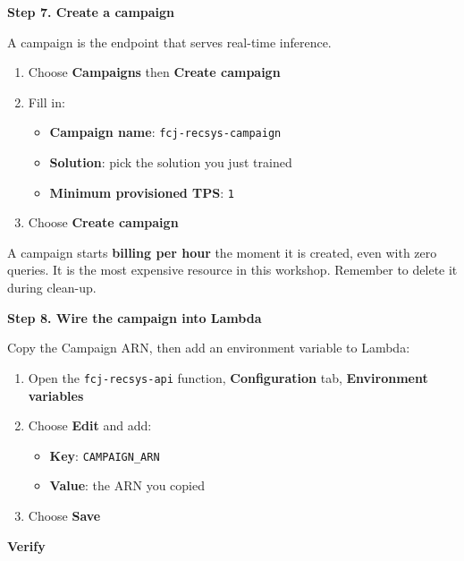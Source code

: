 \vspace{0.5em}\noindent\textbf{Step 7. Create a campaign}\par

A campaign is the endpoint that serves real-time inference.

\begin{enumerate}
\def\labelenumi{\arabic{enumi}.}
\tightlist
\item
  Choose \textbf{Campaigns} then \textbf{Create campaign}
\item
  Fill in:

  \begin{itemize}
  \tightlist
  \item
    \textbf{Campaign name}: \texttt{fcj-recsys-campaign}
  \item
    \textbf{Solution}: pick the solution you just trained
  \item
    \textbf{Minimum provisioned TPS}: \texttt{1}
  \end{itemize}
\item
  Choose \textbf{Create campaign}
\end{enumerate}

A campaign starts \textbf{billing per hour} the moment it is created,
even with zero queries. It is the most expensive resource in this
workshop. Remember to delete it during clean-up.

\vspace{0.5em}\noindent\textbf{Step 8. Wire the campaign into
Lambda}\par

Copy the Campaign ARN, then add an environment variable to Lambda:

\begin{enumerate}
\def\labelenumi{\arabic{enumi}.}
\tightlist
\item
  Open the \texttt{fcj-recsys-api} function, \textbf{Configuration} tab,
  \textbf{Environment variables}
\item
  Choose \textbf{Edit} and add:

  \begin{itemize}
  \tightlist
  \item
    \textbf{Key}: \texttt{CAMPAIGN\_ARN}
  \item
    \textbf{Value}: the ARN you copied
  \end{itemize}
\item
  Choose \textbf{Save}
\end{enumerate}

\vspace{0.5em}\noindent\textbf{Verify}\par

